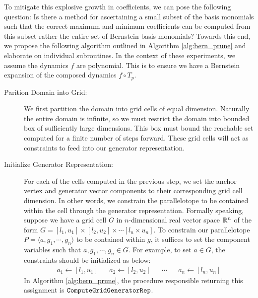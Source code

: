 To mitigate this explosive growth in coefficients, we can pose the following question: Is there a method for ascertaining a small subset of the basis monomials such that the correct maximum and minimum coefficients can be computed from this subset rather the entire set of Bernstein basis monomials?
%
Towards this end, we propose the following algorithm outlined in Algorithm \ref{alg:bern_prune} and elaborate on individual subroutines. In the context of these experiments, we assume the dynamics $f$ are polynomial. This is to ensure we have a Bernstein expansion of the composed dynamics $f \circ T_p$.



\begin{description}
\item[Parition Domain into Grid:] We first partition the domain into grid cells of equal dimension. Naturally the entire domain is infinite, so we must restrict the domain into bounded box of sufficiently large dimensions. This box must bound the reachable set computed for a finite number of steps forward. These grid cells will act as constraints to feed into our generator representation.
\item[Initialize Generator Representation:] For each of the cells computed in the previous step, we set the anchor vertex and generator vector components to their corresponding grid cell dimension. In other words, we constrain the parallelotope to be contained within the cell through the generator representation. Formally speaking, suppose we have a grid cell $G$ in $n$-dimensional real vector space ${\mathbb{R}}^n$ of the form $G = [l_1,u_1] \times [l_2, u_2] \times \cdots [l_n \times u_n]$. To constrain our parallelotope $P = \langle a, g_1, \cdots, g_n\rangle$ to be contained within $g$, it suffices to set the component variables such that $a, g_1, \cdots, g_n \in G$. For example, to set $a \in G$, the constraints should be initialized as below:
\begin{align}
\label{eq:gen_var_interval}
  a_1 \gets [l_1,u_1] & & a_2 \gets [l_2, u_2] & & \cdots & & a_n \gets [l_n,u_n]
\end{align}
%
%
In Algorithm \ref{alg:bern_prune}, the procedure responsible returning this assignment is $\texttt{ComputeGridGeneratorRep}$.


\end{description}
